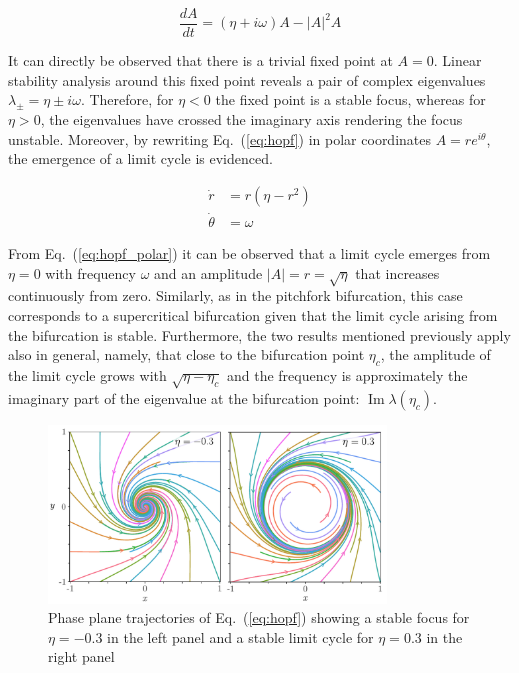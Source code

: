 \begin{equation}
    \dfrac{dA}{dt} = (\eta + i\omega)A - |A|^2 A
     \label{eq:hopf}
\end{equation}

It can directly be observed that there is a trivial fixed point at $A=0$. Linear stability analysis around this fixed point 
reveals a pair of complex eigenvalues $\lambda_\pm = \eta \pm i\omega$. Therefore, for $\eta < 0$ the fixed point is a stable
focus, whereas for $\eta > 0$, the eigenvalues have crossed the imaginary axis rendering the focus unstable. Moreover,
by rewriting Eq.~(\ref{eq:hopf}) in polar coordinates $A = re^{i\theta}$, the emergence of a limit cycle is evidenced.

\begin{align}
    \dot{r} &= r(\eta - r^2)\\
    \dot{\theta} &= \omega
    \label{eq:hopf_polar}
\end{align}

From Eq.~(\ref{eq:hopf_polar}) it can be observed that a limit cycle emerges from $\eta=0$ with frequency $\omega$ and an 
amplitude $|A| = r = \sqrt{\eta}$ that increases continuously from zero. 
Similarly, as in the pitchfork bifurcation, this case corresponds to a supercritical
bifurcation given that the limit cycle arising from the bifurcation is stable. Furthermore, the two results mentioned previously
apply also in general, namely, that close to the
bifurcation point $\eta_c$, the amplitude of the limit cycle grows with $\sqrt{\eta - \eta_c}$ and the frequency is approximately
the imaginary part of the eigenvalue at the bifurcation point: $\operatorname{Im}{\lambda(\eta_c)}$.


\begin{figure}[h]
    \centering
    \includegraphics[width=0.8\textwidth]{imagenes/framework/hopf_phasespace.pdf}
    \caption{Phase plane trajectories of Eq.~(\ref{eq:hopf}) showing a stable
    focus for $\eta = -0.3$ in the left panel and a stable limit cycle for $\eta=0.3$
    in the right panel}
\end{figure}

